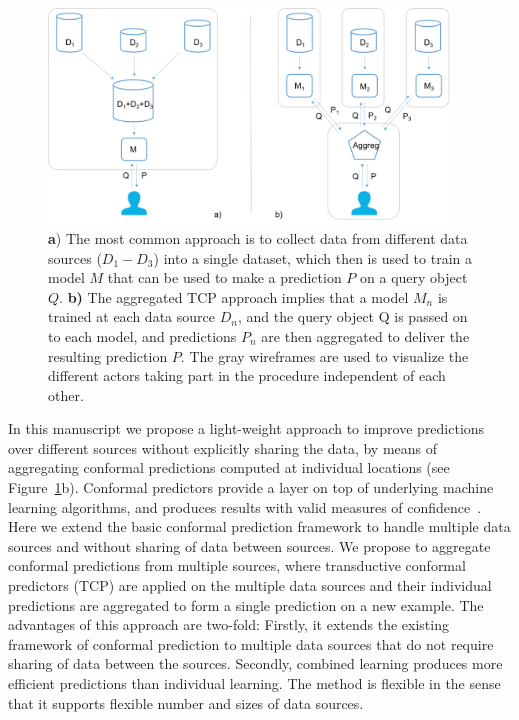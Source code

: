 \documentclass[main]{subfiles}
\begin{document}
 \begin{figure}[b!]
    \includegraphics[width=0.95\textwidth]{images/fig-overview.png}
    \caption{\textbf{a}) The most common approach is to collect data from different data sources ($D_1-D_3$) into a single dataset, which then is used to train a model $M$ that can be used to make a prediction $P$ on a query object $Q$. \textbf{b)} The aggregated TCP approach implies that a model $M_n$ is trained at each data source $D_n$, and the query object Q is passed on to each model, and predictions $P_n$ are then aggregated to deliver the resulting prediction $P$. The gray wireframes are used to visualize the different actors taking part in the procedure independent of each other.}
  \label{fig:overview}
\end{figure}

In this manuscript we propose a light-weight approach to improve predictions over different sources without explicitly sharing the data, by means of aggregating conformal predictions computed at individual locations (see Figure~\ref{fig:overview}b). 
Conformal predictors provide a layer on top of underlying machine learning algorithms, and produces results with valid measures of confidence~\cite{vovk2005algorithmic}.
Here we extend the basic conformal prediction framework to handle multiple data sources and without sharing of data between sources. We propose to aggregate conformal predictions from multiple sources, where transductive conformal predictors (TCP) are applied on the multiple data sources and their individual predictions are aggregated to form a single prediction on a new example.
The advantages of this approach are two-fold: 
Firstly, it extends the existing framework of conformal prediction to multiple data sources that do not require sharing of data between the sources. Secondly, combined learning produces more efficient predictions than individual learning. The method is flexible in the sense that it supports flexible number and sizes of data sources.
\end{document}
